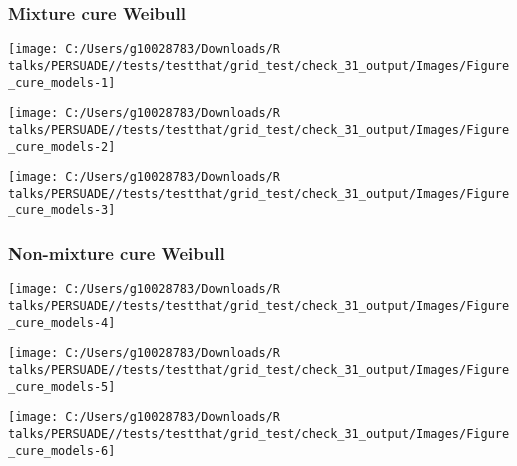 \documentclass[
]{article}
\begin{document}
\clearpage

\clearpage

\subsubsection{Mixture cure Weibull}\label{mixture-cure-weibull}

\begin{flushleft}\texttt{[image: C:/Users/g10028783/Downloads/R talks/PERSUADE//tests/testthat/grid\_test/check\_31\_output/Images/Figure\_cure\_models-1]} \end{flushleft}

\begin{flushleft}\texttt{[image: C:/Users/g10028783/Downloads/R talks/PERSUADE//tests/testthat/grid\_test/check\_31\_output/Images/Figure\_cure\_models-2]} \end{flushleft}

\begin{flushleft}\texttt{[image: C:/Users/g10028783/Downloads/R talks/PERSUADE//tests/testthat/grid\_test/check\_31\_output/Images/Figure\_cure\_models-3]} \end{flushleft}

\clearpage

\subsubsection{Non-mixture cure Weibull}\label{non-mixture-cure-weibull}

\begin{flushleft}\texttt{[image: C:/Users/g10028783/Downloads/R talks/PERSUADE//tests/testthat/grid\_test/check\_31\_output/Images/Figure\_cure\_models-4]} \end{flushleft}

\begin{flushleft}\texttt{[image: C:/Users/g10028783/Downloads/R talks/PERSUADE//tests/testthat/grid\_test/check\_31\_output/Images/Figure\_cure\_models-5]} \end{flushleft}

\begin{flushleft}\texttt{[image: C:/Users/g10028783/Downloads/R talks/PERSUADE//tests/testthat/grid\_test/check\_31\_output/Images/Figure\_cure\_models-6]} \end{flushleft}

\clearpage
\end{document}
